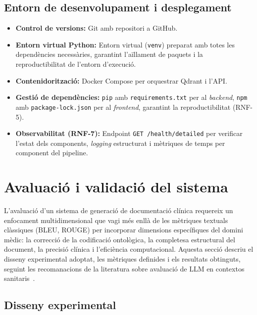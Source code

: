 \documentclass[CAT]{TFUOC}%
\begin{document}
\subsection{Entorn de desenvolupament i desplegament}

\begin{itemize}
    \item \textbf{Control de versions:} Git amb repositori a GitHub.

    \item \textbf{Entorn virtual Python:} Entorn virtual (\texttt{venv}) preparat amb totes les dependències necessàries, garantint l'aïllament de paquets i la reproductibilitat de l'entorn d'execució.

    \item \textbf{Contenidorització:} Docker Compose per orquestrar Qdrant i l'API.

    \item \textbf{Gestió de dependències:} \texttt{pip} amb \texttt{requirements.txt} per al \textit{backend}, \texttt{npm} amb \texttt{package-lock.json} per al \textit{frontend}, garantint la reproductibilitat (RNF-5).

    \item \textbf{Observabilitat (RNF-7):} Endpoint \texttt{GET /health/detailed} per verificar l'estat dels components, \textit{logging} estructurat i mètriques de temps per component del pipeline.
\end{itemize}

\section{Avaluació i validació del sistema}

L'avaluació d'un sistema de generació de documentació clínica requereix un enfocament multidimensional que vagi més enllà de les mètriques textuals clàssiques (BLEU, ROUGE) per incorporar dimensions específiques del domini mèdic: la correcció de la codificació ontològica, la completesa estructural del document, la precisió clínica i l'eficiència computacional. Aquesta secció descriu el disseny experimental adoptat, les mètriques definides i els resultats obtinguts, seguint les recomanacions de la literatura sobre avaluació de LLM en contextos sanitaris~\cite{bedi2025llm,kocaman2025clever}.

\subsection{Disseny experimental}
\end{document}
